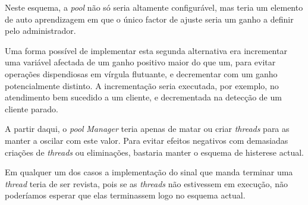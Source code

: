	Neste esquema, a \emph{pool} não só seria altamente configurável, mas teria um elemento de auto aprendizagem em que o único factor de ajuste seria um ganho a definir pelo administrador.

	Uma forma possível de implementar esta segunda alternativa era incrementar uma variável afectada de um ganho positivo maior do que um, para evitar operações dispendiosas em vírgula flutuante, e decrementar com um ganho potencialmente distinto.
	A incrementação seria executada, por exemplo, no atendimento bem sucedido a um cliente, e decrementada na detecção de um cliente parado.
	
	A partir daqui, o \emph{pool} \emph{Manager} teria apenas de matar ou criar \emph{threads} para as manter a oscilar com este valor.
	Para evitar efeitos negativos com demasiadas criações de \emph{threads} ou eliminações, bastaria manter o esquema de histerese actual.

	Em qualquer um dos casos a implementação do sinal que manda terminar uma \emph{thread} teria de ser revista, pois se as \emph{threads} não estivessem em execução, não poderíamos esperar que elas terminassem logo no esquema actual.


\clearpage
